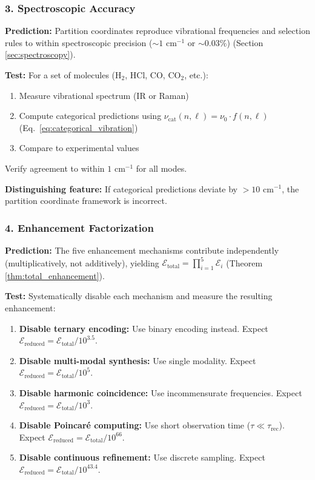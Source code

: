 \documentclass[twocolumn,10pt]{article}
\theoremstyle{remark}
\begin{document}
\subsubsection{3. Spectroscopic Accuracy}

\textbf{Prediction:} Partition coordinates reproduce vibrational frequencies and selection rules to within spectroscopic precision ($\sim 1$ cm$^{-1}$ or $\sim 0.03\%$) (Section \ref{sec:spectroscopy}).

\textbf{Test:} For a set of molecules (H$_2$, HCl, CO, CO$_2$, etc.):
\begin{enumerate}
    \item Measure vibrational spectrum (IR or Raman)
    \item Compute categorical predictions using $\nu_{\text{cat}}(n, \ell) = \nu_0 \cdot f(n, \ell)$ (Eq.~\ref{eq:categorical_vibration})
    \item Compare to experimental values
\end{enumerate}

Verify agreement to within $1$ cm$^{-1}$ for all modes.

\textbf{Distinguishing feature:} If categorical predictions deviate by $> 10$ cm$^{-1}$, the partition coordinate framework is incorrect.

\subsubsection{4. Enhancement Factorization}

\textbf{Prediction:} The five enhancement mechanisms contribute independently (multiplicatively, not additively), yielding $\mathcal{E}_{\text{total}} = \prod_{i=1}^5 \mathcal{E}_i$ (Theorem \ref{thm:total_enhancement}).

\textbf{Test:} Systematically disable each mechanism and measure the resulting enhancement:
\begin{enumerate}
    \item \textbf{Disable ternary encoding:} Use binary encoding instead. Expect $\mathcal{E}_{\text{reduced}} = \mathcal{E}_{\text{total}} / 10^{3.5}$.
    \item \textbf{Disable multi-modal synthesis:} Use single modality. Expect $\mathcal{E}_{\text{reduced}} = \mathcal{E}_{\text{total}} / 10^{5}$.
    \item \textbf{Disable harmonic coincidence:} Use incommensurate frequencies. Expect $\mathcal{E}_{\text{reduced}} = \mathcal{E}_{\text{total}} / 10^{3}$.
    \item \textbf{Disable Poincaré computing:} Use short observation time ($\tau \ll \tau_{\text{rec}}$). Expect $\mathcal{E}_{\text{reduced}} = \mathcal{E}_{\text{total}} / 10^{66}$.
    \item \textbf{Disable continuous refinement:} Use discrete sampling. Expect $\mathcal{E}_{\text{reduced}} = \mathcal{E}_{\text{total}} / 10^{43.4}$.
\end{enumerate}
\end{document}
